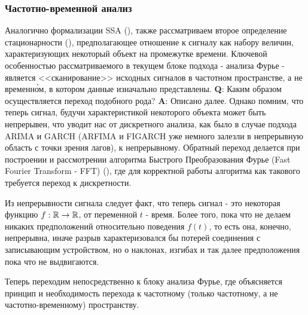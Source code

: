 \subsubsection{Частотно-временной анализ} 

Аналогично формализации SSA (), также рассматриваем  второе определение стационарности (), предполагающее отношение к сигналу как набору величин, характеризующих некоторый объект на промежутке времени. Ключевой особенностью рассматриваемого в текущем блоке подхода - анализа Фурье - является <<сканирование>> исходных сигналов в частотном пространстве, а не временн\'{о}м, в котором данные изначально представлены. \textbf{Q}: Каким образом осуществляется переход подобного рода? \textbf{A}: Описано далее. Однако помним, что теперь сигнал, будучи характеристикой некоторого объекта может быть непрерывен, что уводит нас от дискретного анализа, как было в случае подхода ARIMA и GARCH (ARFIMA и FIGARCH уже немного залезли в непрерывную область с точки зрения лагов), к непрерывному. Обратный переход делается при построении и рассмотрении алгоритма Быстрого Преобразования Фурье (Fast Fourier Transform - FFT) (), где для корректной работы алгоритма как такового требуется переход к дискретности. 

Из непрерывности сигнала следует факт, что теперь сигнал - это некоторая функцию $f: \mathbb{R} \to \mathbb{R}$, от переменной $t$ - время. Более того, пока что не делаем никаких предположений относительно поведения $f(t)$, то есть она, конечно, непрерывна, иначе разрыв характеризовался бы потерей соединения с записывающим устройством, но о наклонах, изгибах и так далее предположения пока что не выдвигаются.

Теперь переходим непосредственно к блоку анализа Фурье, где объясняется принцип и необходимость перехода к частотному (только частотному, а не частотно-временному) пространству.




